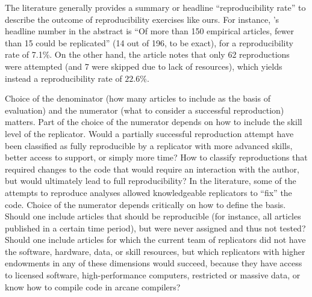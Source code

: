 The literature generally provides a summary or headline ``reproducibility rate'' to describe the outcome of reproducibility exercises like ours.  For instance, \textcite{McCullough2006}'s headline number in the abstract is ``Of more than 150 empirical articles, fewer than 15 could be replicated'' (14 out of 196, to be exact), for a reproducibility rate of 7.1\%. 
On the other hand, the article notes that only 62 reproductions were attempted (and 7 were skipped due to lack of resources), which yields instead a reproducibility rate of $22.6\%$. 

Choice of the denominator (how many articles to include as the basis of evaluation) and the numerator (what to consider a successful reproduction) matters.  Part of the choice of the numerator depends on how to include the skill level of the replicator. Would a partially successful reproduction attempt have been classified as fully reproducible by a replicator with more advanced skills, better access to support, or simply more time? How to classify reproductions that required changes to the code that would require an interaction with the author, but would ultimately lead to full reproducibility? In the literature, some of the attempts to reproduce analyses allowed  knowledgeable replicators to ``fix'' the code. Choice of the numerator depends critically on how to define the basis. Should one include articles that should be reproducible (for instance, all articles published in a certain time period), but were never assigned and thus not tested? Should one include articles for which the current team of replicators did not have the software, hardware, data, or skill resources, but which replicators with higher endowments in any of these dimensions would succeed, because they have access to licensed software, high-performance computers, restricted or massive data, or know how to compile code in arcane compilers?

